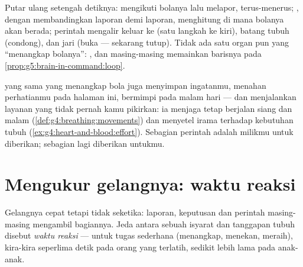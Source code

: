 \begin{example}\label{ex:g5:brain-in-command:catch}
Putar ulang setengah detiknya:  mengikuti bolanya lalu melapor,
terus-menerus; , dengan membandingkan laporan demi laporan,
menghitung di mana bolanya akan berada; perintah mengalir keluar ke
 (satu langkah ke kiri), batang tubuh (condong),  dan
jari (buka --- sekarang tutup). Tidak ada satu organ pun yang
``menangkap bolanya'': ,  dan  masing-masing memainkan
barisnya pada \cref{prop:g5:brain-in-command:loop}.
\end{example}

\begin{remark}\label{rem:g5:brain-in-command:more}
 yang sama yang menangkap bola juga menyimpan ingatanmu, menahan
perhatianmu pada halaman ini, bermimpi pada malam hari --- dan
menjalankan layanan yang tidak pernah kamu pikirkan: ia menjaga
 tetap berjalan siang dan malam
(\cref{def:g4:breathing:movements}) dan menyetel irama 
terhadap kebutuhan tubuh
(\cref{ex:g4:heart-and-blood:effort}). Sebagian perintah adalah
milikmu untuk diberikan; sebagian lagi diberikan  untukmu.
\end{remark}

\section{Mengukur gelangnya: waktu reaksi}

\begin{definition}\label{def:g5:brain-in-command:reaction}
Gelangnya cepat tetapi tidak seketika: laporan, keputusan dan perintah
masing-masing mengambil bagiannya. Jeda antara sebuah isyarat dan
tanggapan tubuh disebut \emph{waktu reaksi}
--- untuk tugas sederhana (menangkap, menekan, meraih),
kira-kira seperlima detik pada orang yang terlatih, sedikit lebih lama
pada anak-anak.
\end{definition}

